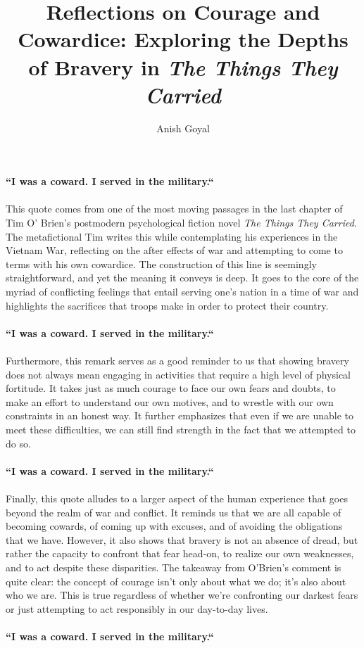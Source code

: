 \documentclass[stu, donotrepeattitle]{apa7}
\title{Reflections on Courage and Cowardice: Exploring the Depths of Bravery in \textit{The Things They Carried}}
\author{Anish Goyal}
\begin{document}
\maketitle
\textbf{``I was a coward. I served in the military.``}\\~\\
This quote comes from one of the most moving passages in the last chapter of Tim O' Brien's postmodern psychological fiction novel \textit{The Things They Carried}. The metafictional Tim writes this while contemplating his experiences in the Vietnam War, reflecting on the after effects of war and attempting to come to terms with his own cowardice. The construction of this line is seemingly straightforward, and yet the meaning it conveys is deep. It goes to the core of the myriad of conflicting feelings that entail serving one's nation in a time of war and highlights the sacrifices that troops make in order to protect their country. \\~\\
\textbf{``I was a coward. I served in the military.``}\\~\\
Furthermore, this remark serves as a good reminder to us that showing bravery does not always mean engaging in activities that require a high level of physical fortitude. It takes just as much courage to face our own fears and doubts, to make an effort to understand our own motives, and to wrestle with our own constraints in an honest way. It further emphasizes that even if we are unable to meet these difficulties, we can still find strength in the fact that we attempted to do so.\\~\\
\textbf{``I was a coward. I served in the military.``}\\~\\
Finally, this quote alludes to a larger aspect of the human experience that goes beyond the realm of war and conflict. It reminds us that we are all capable of becoming cowards, of coming up with excuses, and of avoiding the obligations that we have. However, it also shows that bravery is not an absence of dread, but rather the capacity to confront that fear head-on, to realize our own weaknesses, and to act despite these disparities. The takeaway from O'Brien's comment is quite clear: the concept of courage isn't only about what we do; it's also about who we are. This is true regardless of whether we're confronting our darkest fears or just attempting to act responsibly in our day-to-day lives.\\~\\
\textbf{``I was a coward. I served in the military.``}
\end{document}

